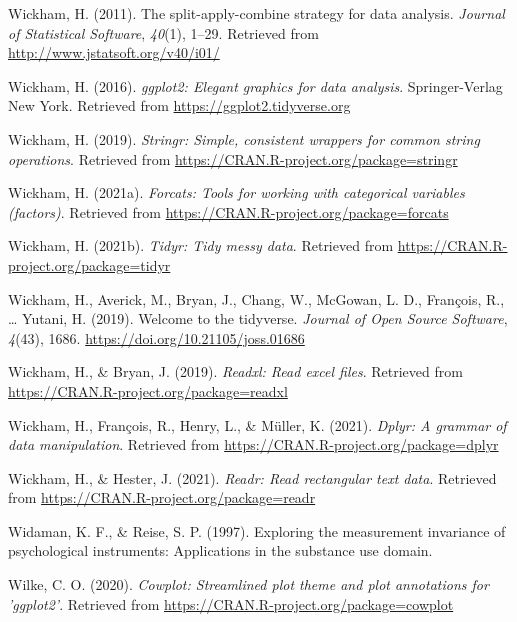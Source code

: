 \documentclass[
  english,
  man]{apa6}
\newlength{\cslhangindent}
\newlength{\cslentryspacingunit} %
\newenvironment{CSLReferences}[2] %
 {%
  \setlength{\parindent}{0pt}
  \ifodd #1
  \let\oldpar\par
  \def\par{\hangindent=\cslhangindent\oldpar}
  \fi
  \setlength{\parskip}{#2\cslentryspacingunit}
 }%
 {}
\begin{document}
\begin{CSLReferences}{1}{0}
\leavevmode{}%
Wickham, H. (2011). The split-apply-combine strategy for data analysis. \emph{Journal of Statistical Software}, \emph{40}(1), 1--29. Retrieved from \url{http://www.jstatsoft.org/v40/i01/}

\leavevmode{}%
Wickham, H. (2016). \emph{ggplot2: Elegant graphics for data analysis}. Springer-Verlag New York. Retrieved from \url{https://ggplot2.tidyverse.org}

\leavevmode{}%
Wickham, H. (2019). \emph{Stringr: Simple, consistent wrappers for common string operations}. Retrieved from \url{https://CRAN.R-project.org/package=stringr}

\leavevmode{}%
Wickham, H. (2021a). \emph{Forcats: Tools for working with categorical variables (factors)}. Retrieved from \url{https://CRAN.R-project.org/package=forcats}

\leavevmode{}%
Wickham, H. (2021b). \emph{Tidyr: Tidy messy data}. Retrieved from \url{https://CRAN.R-project.org/package=tidyr}

\leavevmode{}%
Wickham, H., Averick, M., Bryan, J., Chang, W., McGowan, L. D., François, R., \ldots{} Yutani, H. (2019). Welcome to the {tidyverse}. \emph{Journal of Open Source Software}, \emph{4}(43), 1686. \url{https://doi.org/10.21105/joss.01686}

\leavevmode{}%
Wickham, H., \& Bryan, J. (2019). \emph{Readxl: Read excel files}. Retrieved from \url{https://CRAN.R-project.org/package=readxl}

\leavevmode{}%
Wickham, H., François, R., Henry, L., \& Müller, K. (2021). \emph{Dplyr: A grammar of data manipulation}. Retrieved from \url{https://CRAN.R-project.org/package=dplyr}

\leavevmode{}%
Wickham, H., \& Hester, J. (2021). \emph{Readr: Read rectangular text data}. Retrieved from \url{https://CRAN.R-project.org/package=readr}

\leavevmode{}%
Widaman, K. F., \& Reise, S. P. (1997). Exploring the measurement invariance of psychological instruments: Applications in the substance use domain.

\leavevmode{}%
Wilke, C. O. (2020). \emph{Cowplot: Streamlined plot theme and plot annotations for 'ggplot2'}. Retrieved from \url{https://CRAN.R-project.org/package=cowplot}


\end{CSLReferences}
\end{document}
